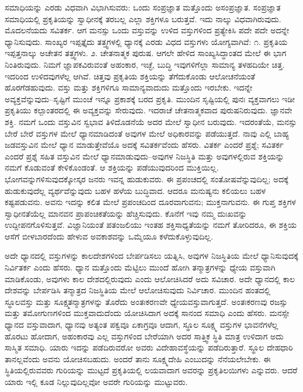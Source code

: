 ಸಮಾಧಿಯನ್ನು ಎರಡು ವಿಧವಾಗಿ ವಿಭಾಗಿಸುವರು: ಒಂದು ಸಂಪ್ರಜ್ಞಾತ ಮತ್ತೊಂದು ಅಸಂಪ್ರಜ್ಞಾತ. ಸಂಪ್ರಜ್ಞಾತ ಸಮಾಧಿಯಲ್ಲಿ ಪ್ರಕೃತಿಯನ್ನು ಸ್ವಾಧೀನಕ್ಕೆ ತರಬಲ್ಲ ಎಲ್ಲಾ ಶಕ್ತಿಗಳೂ ಬರುತ್ತವೆ. ಇದು ನಾಲ್ಕು ವಿಧವಾಗಿರುವುದು. ಮೊದಲನೆಯದು ಸವಿತರ್ಕ. ಆಗ ಮನಸ್ಸು ಒಂದು ವಸ್ತುವನ್ನು ಉಳಿದ ವಸ್ತುಗಳಿಂದ ಪ್ರತ್ಯೇಕಿಸಿ ಪದೇ ಪದೇ ಅದನ್ನೇ ಧ್ಯಾನಿಸುವುದು. ಸಾಂಖ್ಯರ ಇಪ್ಪತ್ತೈದು ತತ್ತ್ವಗಳಲ್ಲಿ ಧ್ಯಾನಕ್ಕೆ ಎರಡು ವಿಧದ ವಸ್ತುಗಳು ಯೋಗ್ಯವಾಗಿವೆ: ೧. ಪ್ರಕೃತಿಯ ಇಪ್ಪತ್ತನಾಲ್ಕು ಅಚೇತನ ತತ್ತ್ವಗಳು. ೨. ಚೇತನಾತ್ಮಕ ಪುರುಷ. ಆಗಲೇ ಹೇಳಿದ ಸಾಂಖ್ಯಸಿದ್ಧಾಂತದ ಮೇಲೆ ಈ ಭಾಗ ನಿಂತಿರುವುದು. ನಿಮಗೆ ಜ್ಞಾಪಕವಿರುವಂತೆ ಅಹಂಕಾರ, ಇಚ್ಛೆ, ಬುದ್ಧಿ ಇವುಗಳಿಗೆಲ್ಲಾ ಸಾಮಾನ್ಯ ತಳಹದಿಯೇ ಚಿತ್ತ. ಇದರಿಂದ ಉಳಿದವುಗಳೆಲ್ಲ ಆಗಿವೆ. ಚಿತ್ತವು ಪ್ರಕೃತಿಯ ಶಕ್ತಿಯನ್ನು ತೆಗೆದುಕೊಂಡು ಆಲೋಚನೆಯಂತೆ ಹೊರಗೆಡಹುವುದು. ವಸ್ತು ಮತ್ತು ಶಕ್ತಿಗಳಿಗೂ ಸಾಮಾನ್ಯವಾದುದು ಮತ್ತೊಂದು ಇರಬೇಕು. ಇದನ್ನೇ ಅವ್ಯಕ್ತವೆನ್ನುವುದು–ಸೃಷ್ಟಿಗೆ ಮುಂಚೆ ಇನ್ನೂ ಪ್ರಕಾಶಕ್ಕೆ ಬರದ ಪ್ರಕೃತಿ. ಮುಂದಿನ ಸೃಷ್ಟಿಯಲ್ಲಿ ಪುನಃ ವ್ಯಕ್ತವಾಗಲು ಇಡೀ ಪ್ರಕೃತಿಯು ಕಲ್ಪಾಂತರದಲ್ಲಿ ಈ ಅವ್ಯಕ್ತವನ್ನು ಸೇರುವುದು. ಇದರಾಚೆ ಚೇತನಾತ್ಮಕವಾದ ಪುರುಷನಿರುವುದು. ಜ್ಞಾನವೇ ಶಕ್ತಿ. ನಮಗೆ ಒಂದು ವಸ್ತುವಿನ ಸ್ವಭಾವ ತಿಳಿದೊಡನೆಯೆ ಅದರ ಮೇಲೆ ಸ್ವಾಧೀನ ಬರುವುದು. ಇದರಂತೆಯೆ, ಮನಸ್ಸು ಬೇರೆ ಬೇರೆ ವಸ್ತುಗಳ ಮೇಲೆ ಧ್ಯಾನಮಾಡಿದಂತೆ ಅವುಗಳ ಮೇಲೆ ಅಧಿಕಾರವನ್ನು ಪಡೆಯುತ್ತದೆ. ನಾವು ಎಲ್ಲಿ ಬಾಹ್ಯ ಜಡವಸ್ತುವಿನ ಮೇಲೆ ಧ್ಯಾನ ಮಾಡುತ್ತೇವೆಯೊ ಅದಕ್ಕೆ ಸವಿತರ್ಕವೆಂದು ಹೆಸರು. ವಿತರ್ಕ ಎಂದರೆ ಪ್ರಶ್ನೆ; ಸವಿತರ್ಕ ಎಂದರೆ ಪ್ರಶ್ನೆ ಸಹಿತ ವಸ್ತುವಿನ ಮೇಲೆ ಧ್ಯಾನಮಾಡುವುದು–ಅವುಗಳ ನಿಜಸ್ಥಿತಿ ಮತ್ತು ಅವುಗಳಲ್ಲಿರುವ ಶಕ್ತಿಯನ್ನು ನಮಗೆ ಕೊಡುವಂತೆ ಕೇಳಿಕೊಂಡಂತೆ. ಆ ಶಕ್ತಿಯನ್ನು ಪಡೆಯುವುದರಿಂದ ಮುಕ್ತಿಯಿಲ್ಲ. ಭೋಗವನ್ನುಗಳಿಸುವುದಕ್ಕೋಸ್ಕರ ಜನರು ಇವನ್ನ ಹುಡುಕುವರು. ಈ ಪ್ರಪಂಚದಲ್ಲಿ ಸಂತೋಷವೆನ್ನುವುದಿಲ್ಲ; ಅದಕ್ಕೆ ಹುಡುಕುವುದೆಲ್ಲ ವ್ಯರ್ಥವೆನ್ನುವುದು ಬಹಳ ಹಳೆಯ ಬುದ್ಧಿವಾದ. ಆದರೂ ಮನುಷ್ಯನು ಕಲಿಯಲು ಬಹಳ ಕಷ್ಟಪಡುವನು. ಅವನು ಇದನ್ನು ಕಲಿತ ಮೇಲೆ ಪ್ರಪಂಚದಿಂದ ದೂರವಾಗುವನು; ಮುಕ್ತನಾಗುವನು. ಈ ಗುಪ್ತ ಶಕ್ತಿಗಳ ಸ್ವಾಧೀನತೆಯೆಲ್ಲ ಮಾನವನ ಪ್ರಾಪಂಚಿಕತೆಯನ್ನು ಹೆಚ್ಚಿಸುವುದು. ಕೊನೆಗೆ ಇವು ನಮ್ಮ ದುಃಖವನ್ನು ಉದ್ದೀಪನಗೊಳಿಸುತ್ತವೆ. ವಿಜ್ಞಾನಿಯಂತೆ ಪತಂಜಲಿಯು ಇಂತಹ ಶಕ್ತಿಸಾಧ್ಯತೆಯನ್ನು ನಮಗೆ ತೋರಿದರೂ, ಈ ಶಕ್ತಿಯ ಆಸೆಗೆ ಬೀಳಬಾರದೆಂದು ಹೇಳುವ ಅವಕಾಶವನ್ನು ಒಮ್ಮೆಯೂ ಕಳೆದುಕೊಳ್ಳುವುದಿಲ್ಲ. 

ಅದೇ ಧ್ಯಾನದಲ್ಲಿ ವಸ್ತುಗಳನ್ನು ಕಾಲದೇಶಗಳಿಂದ ಬೇರ್ಪಡಿಸಲು ಯತ್ನಿಸಿ, ಅವುಗಳ ನಿಜಸ್ಥಿತಿಯ ಮೇಲೆ ಧ್ಯಾನಿಸುವುದಕ್ಕೆ ನಿರ್ವಿತರ್ಕ ಎಂದು ಹೆಸರು. ಧ್ಯಾನ ಮತ್ತೊಂದು ಮೆಟ್ಟಿಲು ಮುಂದೆ ಹೋಗಿ ತನ್ಮಾತ್ರಗಳನ್ನು ಧ್ಯೇಯ ವಸ್ತುವಾಗಿ ಮಾಡಿಕೊಂಡು, ಅವುಗಳು ಕಾಲ ದೇಶದಲ್ಲಿರುವುದು ಎಂದು ಆಲೋಚಿಸಿದರೆ ಅದು ಸವಿಚಾರ. ಅದೇ ಧ್ಯಾನದಲ್ಲಿ ಕಾಲ ದೇಶವನ್ನು ಬೇರ್ಪಡಿಸಿ ತನ್ಮಾತ್ರದ ನಿಜಸ್ಥಿತಿಯ ಮೇಲೆ ಆಲೋಚಿಸುವುದು ನಿರ್ವಿಚಾರ. ಮುಂದಿನ ಹಂತದಲ್ಲಿ ಸ್ಥೂಲವಸ್ತು ಮತ್ತು ಸೂಕ್ಷ್ಮತನ್ಮಾತ್ರಗಳನ್ನು ತೊರೆದು ಅಂತಃಕರಣವೇ ಧ್ಯೇಯವಸ್ತುವಾಗುತ್ತದೆ. ಅಂತಃಕರಣವು ರಜಸ್ಸು ಮತ್ತು ತಮೋಗುಣಗಳಿಂದ ಮುಕ್ತವಾದುದೆಂದು ಯೋಚಿಸಿದಾಗ ಅದಕ್ಕೆ ಸಾನಂದ ಸಮಾಧಿ ಎಂದು ಹೆಸರು. ಮನಸ್ಸೇ ಧ್ಯಾನದ ವಸ್ತುವಾದಾಗ, ಧ್ಯಾನವು ಅತ್ಯಂತ ಪಕ್ವವೂ ಏಕಾಗ್ರವೂ ಆದಾಗ, ಸ್ಥೂಲ ಸೂಕ್ಷ್ಮ ವಸ್ತುಗಳ ಭಾವನೆಗಳೆಲ್ಲ ಹೊರಟು ಹೋದಾಗ, ಅಹಂಕಾರವು ಎಲ್ಲ ವಸ್ತುಗಳಿಂದ ಬೇರೆಯಾಗಿ ಅದರ ಸಾತ್ತ್ವಿಕ ಸ್ಥಿತಿ ಮಾತ್ರ ಉಳಿದಾಗ ಅದು ಸಾಸ್ಮಿತ ಸಮಾಧಿ. ಯಾರು ಇದನ್ನು ಪಡೆದಿರುವರೋ ಅವರು ವಿದೇಹಾವಸ್ಥೆಯನ್ನು ಪಡೆದಿರುತ್ತಾರೆ. ಸ್ಥೂಲ ದೇಹಧಾರಿ ತಾನಲ್ಲವೆಂದು ಅವನು ಯೋಚಿಸಬಹುದು. ಅಂದರೆ ತಾನು ಸೂಕ್ಷ್ಮದೇಹಿ ಎಂಬುದನ್ನು ನೆನೆಯಲೇಬೇಕು. ಈ ಸ್ಥಿತಿಯಲ್ಲಿರುವವರು ಗುರಿಯನ್ನು ಮುಟ್ಟದೆ ಪ್ರಕೃತಿಯಲ್ಲಿ ಲಯವಾದಾಗ ಅವರನ್ನು ಪ್ರಕೃತಿಲಯಿಗಳು ಎನ್ನುವರು. ಆದರೆ ಯಾರು ಇಲ್ಲಿ ಕೂಡ ನಿಲ್ಲುವುದಿಲ್ಲವೋ ಅವರೇ ಗುರಿಯನ್ನು ಮುಟ್ಟುವರು. 

